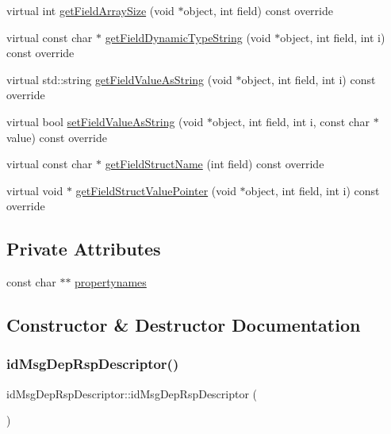 \begin{DoxyCompactItemize}
\item 
virtual int \hyperlink{classid_msg_dep_rsp_descriptor_a47159497c46236c093f395def9ea2601}{get\+Field\+Array\+Size} (void $\ast$object, int field) const override
\item 
virtual const char $\ast$ \hyperlink{classid_msg_dep_rsp_descriptor_af4fdd8255c6294f4c68d7a8ce3cec648}{get\+Field\+Dynamic\+Type\+String} (void $\ast$object, int field, int i) const override
\item 
virtual std\+::string \hyperlink{classid_msg_dep_rsp_descriptor_af28908b0998ae5028ce4439705a56bea}{get\+Field\+Value\+As\+String} (void $\ast$object, int field, int i) const override
\item 
virtual bool \hyperlink{classid_msg_dep_rsp_descriptor_a3b2b332f7e3426e7b6464a973de48013}{set\+Field\+Value\+As\+String} (void $\ast$object, int field, int i, const char $\ast$value) const override
\item 
virtual const char $\ast$ \hyperlink{classid_msg_dep_rsp_descriptor_a2c04a28f7d859199945889c5c1f1525f}{get\+Field\+Struct\+Name} (int field) const override
\item 
virtual void $\ast$ \hyperlink{classid_msg_dep_rsp_descriptor_a1c3f7a29a3bd609bcb9da8317720f673}{get\+Field\+Struct\+Value\+Pointer} (void $\ast$object, int field, int i) const override
\end{DoxyCompactItemize}
\subsection*{Private Attributes}
\begin{DoxyCompactItemize}
\item 
const char $\ast$$\ast$ \hyperlink{classid_msg_dep_rsp_descriptor_ab4be8a53831c1ebca93af83b99b3be40}{propertynames}
\end{DoxyCompactItemize}


\subsection{Constructor \& Destructor Documentation}
\mbox{\label{classid_msg_dep_rsp_descriptor_abedc396206c401b49a270bdc1bce5005}} 
\subsubsection{\texorpdfstring{id\+Msg\+Dep\+Rsp\+Descriptor()}{idMsgDepRspDescriptor()}}
{\footnotesize\ttfamily id\+Msg\+Dep\+Rsp\+Descriptor\+::id\+Msg\+Dep\+Rsp\+Descriptor (\begin{DoxyParamCaption}{ }\end{DoxyParamCaption})}

